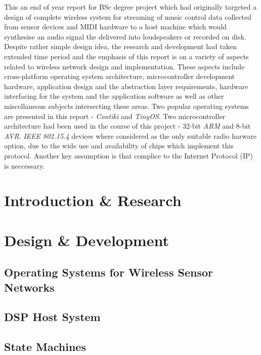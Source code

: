 \abstract
{

   This an end of year report for BSc degree project which had originally targeted
  a design of complete wireless system for streaming of music control data collected
  from sensor devices and MIDI hardware to a host machine which would synthesise an
  audio signal the delivered into loudspeakers or recorded on disk. Despite rather
  simple design idea, the research and development had taken extended time period
  and the emphasis of this report is on a variety of aspects related to wireless
  network design and implementation. These aspects include cross-platform operating
  system architecture, microcontroller development hardware, application design and
  the abstraction layer requirements, hardware interfacing for the system and the
  application software as well as other miscellaneous subjects intersecting these
  areas. Two popular operating systems are presented in this report - \emph{Contiki}
  and \emph{TinyOS}. Two microcontroller architecture had been used in the course
  of this project - 32-bit \emph{ARM} and 8-bit \emph{AVR}. \emph{IEEE 802.15.4}
  devices where considered as the only suitable radio harware option, due to the
  wide use and availability of chips which implement this protocol. Another key
  assumption is that complice to the Internet Protocol (IP) is neccessary.

}

\tableofcontents
\listoffigures


\part{Introduction \& Research}
\part{Design \& Development} 
\chapter{Operating Systems for Wireless Sensor Networks}



\chapter{DSP Host System}



\chapter{State Machines}









